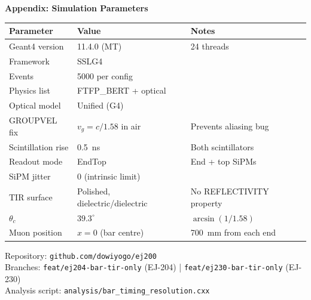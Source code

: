 \documentclass[aspectratio=169,10pt]{beamer}
\begin{document}
\begin{frame}[plain]
  \begin{center}
    \Large\textbf{Appendix: Simulation Parameters}
  \end{center}

  \renewcommand{\arraystretch}{1.2}
  \begin{tabular}{@{}lll@{}}
    \toprule
    Parameter & Value & Notes \\
    \midrule
    Geant4 version   & 11.4.0 (MT) & 24 threads \\
    Framework        & SSLG4 & \\
    Events           & 5000 per config & \\
    Physics list     & FTFP\_BERT + optical & \\
    Optical model    & Unified (G4) & \\
    GROUPVEL fix     & $v_g = c/1.58$ in air & Prevents aliasing bug \\
    Scintillation rise & \SI{0.5}{ns} & Both scintillators \\
    Readout mode     & EndTop & End + top SiPMs \\
    SiPM jitter      & 0 (intrinsic limit) & \\
    TIR surface      & Polished, dielectric/dielectric & No REFLECTIVITY property \\
    $\theta_c$       & $39.3^\circ$ & $\arcsin(1/1.58)$ \\
    Muon position    & $x=0$ (bar centre) & \SI{700}{mm} from each end \\
    \bottomrule
  \end{tabular}

\vspace{0.8em}
{\footnotesize
Repository: \texttt{github.com/dowiyogo/ej200} \\
Branches: \texttt{feat/ej204-bar-tir-only} (EJ-204) | \texttt{feat/ej230-bar-tir-only} (EJ-230) \\
Analysis script: \texttt{analysis/bar\_timing\_resolution.cxx}
}

\end{frame}
\end{document}
